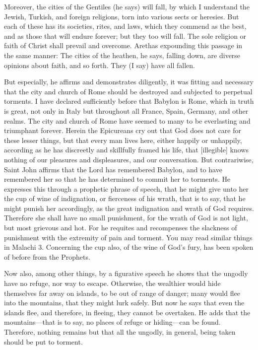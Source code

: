 Moreover, the cities of the Gentiles (he says) will fall, by which I understand the Jewish, Turkish, and foreign religions, torn into various sects or heresies. But each of these has its societies, rites, and laws, which they commend as the best, and as those that will endure forever; but they too will fall. The sole religion or faith of Christ shall prevail and overcome. Arethas expounding this passage in the same manner: The cities of the heathen, he says, falling down, are diverse opinions about faith, and so forth. They (I say) have all fallen.

But especially, he affirms and demonstrates diligently, it was fitting and necessary that the city and church of Rome should be destroyed and subjected to perpetual torments. I have declared sufficiently before that Babylon is Rome, which in truth is great, not only in Italy but throughout all France, Spain, Germany, and other realms. The city and church of Rome have seemed to many to be everlasting and triumphant forever. Herein the Epicureans cry out that God does not care for these lesser things, but that every man lives here, either happily or unhappily, according as he has discreetly and skillfully framed his life, that [illegible] knows nothing of our pleasures and displeasures, and our conversation. But contrariwise, Saint John affirms that the Lord has remembered Babylon, and to have remembered her so that he has determined to commit her to torments. He expresses this through a prophetic phrase of speech, that he might give unto her the cup of wine of indignation, or fierceness of his wrath, that is to say, that he might punish her accordingly, as the great indignation and wrath of God requires. Therefore she shall have no small punishment, for the wrath of God is not light, but most grievous and hot. For he requites and recompenses the slackness of punishment with the extremity of pain and torment. You may read similar things in Malachi 3. Concerning the cup also, of the wine of God’s fury, has been spoken of before from the Prophets.

Now also, among other things, by a figurative speech he shows that the ungodly have no refuge, nor way to escape. Otherwise, the wealthier would hide themselves far away on islands, to be out of range of danger; many would flee into the mountains, that they might lurk safely. But now he says that even the islands flee, and therefore, in fleeing, they cannot be overtaken. He adds that the mountains—that is to say, no places of refuge or hiding—can be found. Therefore, nothing remains but that all the ungodly, in general, being taken should be put to torment.

